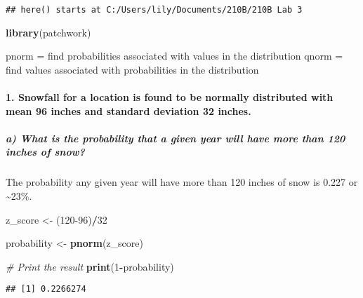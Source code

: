 \documentclass[
]{article}
\newenvironment{Shaded}{\begin{snugshade}}{\end{snugshade}}
\newcommand{\CommentTok}[1]{\textcolor[rgb]{0.56,0.35,0.01}{\textit{#1}}}
\newcommand{\DecValTok}[1]{\textcolor[rgb]{0.00,0.00,0.81}{#1}}
\newcommand{\FunctionTok}[1]{\textcolor[rgb]{0.13,0.29,0.53}{\textbf{#1}}}
\newcommand{\NormalTok}[1]{#1}
\newcommand{\OtherTok}[1]{\textcolor[rgb]{0.56,0.35,0.01}{#1}}
\newcommand{\SpecialCharTok}[1]{\textcolor[rgb]{0.81,0.36,0.00}{\textbf{#1}}}
\begin{document}
\begin{verbatim}
## here() starts at C:/Users/lily/Documents/210B/210B Lab 3
\end{verbatim}

\begin{Shaded}
\begin{Highlighting}[]
\FunctionTok{library}\NormalTok{(patchwork)}
\end{Highlighting}
\end{Shaded}

pnorm = find probabilities associated with values in the distribution
qnorm = find values associated with probabilities in the distribution

\hypertarget{snowfall-for-a-location-is-found-to-be-normally-distributed-with-mean-96-inches-and-standard-deviation-32-inches.}{%
\paragraph{1. Snowfall for a location is found to be normally
distributed with mean 96 inches and standard deviation 32
inches.}\label{snowfall-for-a-location-is-found-to-be-normally-distributed-with-mean-96-inches-and-standard-deviation-32-inches.}}

\hypertarget{a-what-is-the-probability-that-a-given-year-will-have-more-than-120-inches-of-snow}{%
\subparagraph{a) What is the probability that a given year will have
more than 120 inches of
snow?}\label{a-what-is-the-probability-that-a-given-year-will-have-more-than-120-inches-of-snow}}

The probability any given year will have more than 120 inches of snow is
0.227 or \textasciitilde23\%.

\begin{Shaded}
\begin{Highlighting}[]
\NormalTok{z\_score }\OtherTok{\textless{}{-}}\NormalTok{ (}\DecValTok{120{-}96}\NormalTok{)}\SpecialCharTok{/}\DecValTok{32}

\NormalTok{probability }\OtherTok{\textless{}{-}} \FunctionTok{pnorm}\NormalTok{(z\_score)}

\CommentTok{\# Print the result}
\FunctionTok{print}\NormalTok{(}\DecValTok{1}\SpecialCharTok{{-}}\NormalTok{probability)}
\end{Highlighting}
\end{Shaded}

\begin{verbatim}
## [1] 0.2266274
\end{verbatim}
\end{document}
